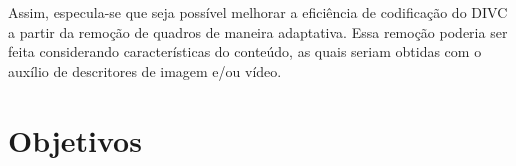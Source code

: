 Assim, especula-se que seja possível melhorar a eficiência de codificação do \ac{DIVC} a partir da remoção de quadros de maneira adaptativa. Essa remoção poderia ser feita considerando características do conteúdo, as quais seriam obtidas com o auxílio de descritores de imagem e/ou vídeo.



\section{Objetivos}






